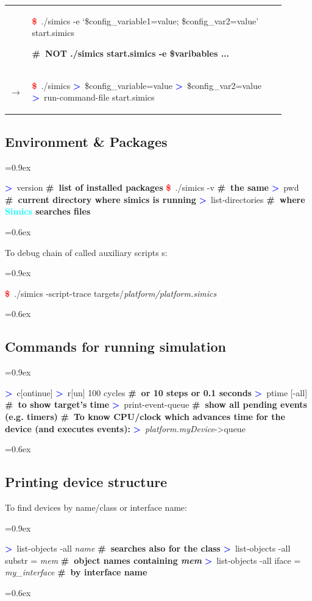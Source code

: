 \documentclass[8pt]{extarticle}
\newcommand{\mywarning}{{\huge \warning}}
\newenvironment{code}[1][]{%
\begin{prebox}[#1]\obeylines%
\fontdimen2\font=0.9ex%
}{%
\end{prebox}%
\fontdimen2\font=0.6ex%
}
\newenvironment{codem}[2][\linewidth]{%
\begin{minipage}{#1}%
\begin{prebox}[colback=#2]\obeylines}{%
\end{prebox}%
\end{minipage}}
\newenvironment{code9}{%
\begin{codem}[0.9\linewidth]{green!10}}{\end{codem}}
\newcommand{\cod}[2][green!10]{\tcbox[
    size=fbox,
    on line,
    colback=#1,
    colframe=black,
    arc=0.3em  %
]{#2}}
\newcommand{\ind}{\hphantom{~~~}}
\newcommand{\prompt}{\textcolor{red}{\textbf{\$}\ }}
\newcommand{\sprompt}{\textcolor{blue}{\textbf{>}\ }}
\newcommand{\cmtcommon}[1]{\textcolor{Sepia}{\textbf{#1}}}
\newcommand{\cmt}[1]{\cmtcommon{\#\ #1}}
\newcommand{\p}[1]{\textit{\large#1}}
\newcommand{\Simics}{\textcolor{cyan}{\textbf{Simics}}}
\begin{document}
\begin{multicols*}{3}
\begin{tabular}{p{0.05\linewidth}p{0.85\linewidth}}
        & \begin{code9}
            \prompt ./simics -e ‘\$config_variable1=value; \$config_var2=value’ start.simics

            \cmt{\mywarning NOT ./simics start.simics -e \$varibables ...}
        \end{code9}
        \vspace{0.05cm}
        \\
        $\longrightarrow$ &
        \begin{code9}
            \prompt ./simics
            \sprompt \$config_variable=value
            \sprompt \$config_var2=value
            \sprompt run-command-file start.simics
        \end{code9}
    \end{tabular}

\subsection{Environment \& Packages}
    \begin{code}
        \sprompt version  \cmt{list of installed packages}
        \prompt ./simics -v \cmt{the same}
        \sprompt pwd \cmt{current directory where simics is running}
        \sprompt list-directories \cmt{where \Simics{} searches files}
    \end{code}


    To debug chain of called auxiliary scripts \cod{include}s:
    \begin{code}
        \prompt ./simics -script-trace targets/\p{platform/platform.simics}
    \end{code}

\subsection{Commands for running simulation}
\begin{code}
\sprompt c[ontinue]
\sprompt r[un] 100 cycles \ind \cmt{or 10 steps or 0.1 seconds}
\sprompt ptime [-all] \ind \cmt{to show target's time}
\sprompt print-event-queue \ind \cmt{show all pending events (e.g. timers)}
\cmt{To know CPU/clock which advances time for the device (and executes events):}
\sprompt \p{platform.myDevice}->queue
\end{code}

\subsection{Printing device structure}
To find devices by name/class or interface name:
    \begin{code}
        \sprompt list-objects -all \p{name} \ind \cmt{searches also for the class}
        \sprompt list-objects -all substr = \p{mem} \cmt{object names containing \p{mem}}
        \sprompt list-objects -all iface = \p{my_interface} \cmt{by interface name}
    \end{code}


\end{multicols*}
\end{document}
